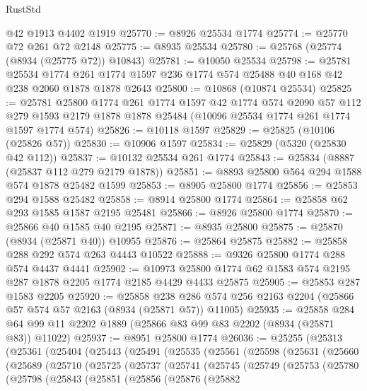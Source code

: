 \begin{lexlean}{RustStd}
\begin{coremodule}
    @42
    @1913
    @4402
    @1919
@25770 := @8926 @25534 @1774
@25774 := @25770 @72 @261 @72 @2148
@25775 := @8935 @25534
@25780 := @25768 (@25774 (@8934 (@25775 @72)) @10843)
@25781 := @10050 @25534
@25798 := @25781
    @25534
    @1774
    @261
    @1774
    @1597
    @236
    @1774
    @574
    @25488
    @40
    @168
    @42
    @238
    @2060
    @1878
    @1878
    @2643
@25800 := @10868 (@10874 @25534)
@25825 := @25781
    @25800
    @1774
    @261
    @1774
    @1597
    @42
    @1774
    @574
    @2090
    @57
    @112
    @279
    @1593
    @2179
    @1878
    @1878
    @25484
    (@10096 @25534 @1774 @261 @1774 @1597 @1774 @574)
@25826 := @10118 @1597
@25829 := @25825 (@10106 (@25826 @57))
@25830 := @10906 @1597
@25834 := @25829 (@5320 (@25830 @42 @112))
@25837 := @10132 @25534 @261 @1774
@25843 := @25834 (@8887 (@25837 @112 @279 @2179 @1878))
@25851 := @8893 @25800 @564 @294 @1588 @574 @1878 @25482 @1599
@25853 := @8905 @25800 @1774
@25856 := @25853 @294 @1588 @25482
@25858 := @8914 @25800 @1774
@25864 := @25858 @62 @293 @1585 @1587 @2195 @25481
@25866 := @8926 @25800 @1774
@25870 := @25866 @40 @1585 @40 @2195
@25871 := @8935 @25800
@25875 := @25870 (@8934 (@25871 @40)) @10955
@25876 := @25864 @25875
@25882 := @25858 @288 @292 @574 @263 @4443 @10522
@25888 := @9326 @25800 @1774 @288 @574 @4437 @4441
@25902 := @10973 @25800 @1774 @62 @1583 @574 @2195 @287 @1878 @2205 @1774 @2185 @4429 @4433 @25875
@25905 := @25853 @287 @1583 @2205
@25920 := @25858
    @238
    @286
    @574
    @256
    @2163
    @2204
    (@25866 @57 @574 @57 @2163 (@8934 (@25871 @57)) @11005)
@25935 := @25858 @284 @64 @99 @11 @2202 @1889 (@25866 @83 @99 @83 @2202 (@8934 (@25871 @83)) @11022)
@25937 := @8951 @25800 @1774
@26036 := @25255
    (@25313
      (@25361
        (@25404
          (@25443
            (@25491
              (@25535
                (@25561
                  (@25598
                    (@25631
                      (@25660
                        (@25689
                          (@25710
                            (@25725
                              (@25737
                                (@25741
                                  (@25745
                                    (@25749
                                      (@25753
                                        (@25780
                                          (@25798
                                            (@25843
                                              (@25851
                                                (@25856
                                                  (@25876
                                                    (@25882

\end{coremodule}
\end{lexlean}

